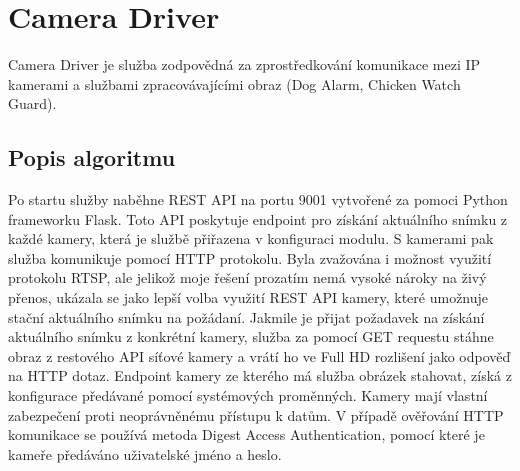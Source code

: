 \section{Camera Driver}\label{sec:camera-driver}
Camera Driver je služba zodpovědná za zprostředkování komunikace mezi IP kamerami a službami zpracovávajícími obraz (Dog Alarm, Chicken Watch Guard).\newline

\subsection*{Popis algoritmu}
Po startu služby naběhne REST API na portu 9001 vytvořené za pomoci Python frameworku Flask.
Toto API poskytuje endpoint pro získání aktuálního snímku z každé kamery, která je službě přiřazena v konfiguraci modulu.
S kamerami pak služba komunikuje pomocí HTTP protokolu.
Byla zvažována i možnost využití protokolu RTSP, ale jelikož moje řešení prozatím nemá vysoké nároky na živý přenos, ukázala se jako lepší volba využití REST API kamery, které umožnuje stační aktuálního snímku na požádaní.
Jakmile je přijat požadavek na získání aktuálního snímku z konkrétní kamery, služba za pomocí GET requestu stáhne obraz z restového API síťové kamery a vrátí ho ve Full HD rozlišení jako odpověď na HTTP dotaz.
Endpoint kamery ze kterého má služba obrázek stahovat, získá z konfigurace předávané pomocí systémových proměnných.
Kamery mají vlastní zabezpečení proti neoprávněnému přístupu k datům.
V případě ověřování HTTP komunikace se používá metoda Digest Access Authentication, pomocí které je kameře předáváno uživatelské jméno a heslo.


%
%
%
%
